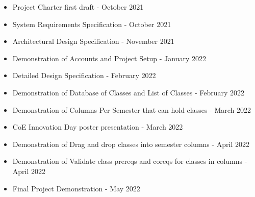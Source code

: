 
\begin{itemize}
  \item Project Charter first draft - October 2021
  \item System Requirements Specification - October 2021
  \item Architectural Design Specification - November 2021
  \item Demonstration of Accounts and Project Setup - January 2022
  \item Detailed Design Specification - February 2022
  \item Demonstration of Database of Classes and List of Classes - February 2022
  \item Demonstration of Columns Per Semester that can hold classes - March 2022
  \item CoE Innovation Day poster presentation - March 2022
  \item Demonstration of Drag and drop classes into semester columns - April 2022
  \item Demonstration of Validate class prereqs and coreqs for classes in columns - April 2022
  \item Final Project Demonstration - May 2022
\end{itemize}
